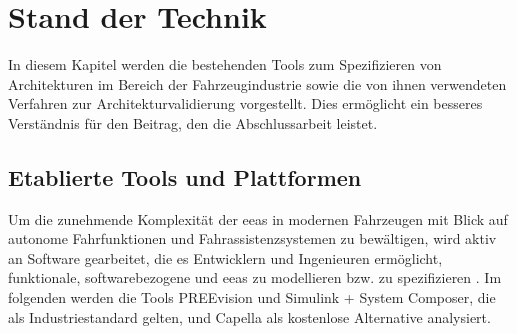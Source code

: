 
\chapter{Stand der Technik}
\label{ch:relatedWork}


In diesem Kapitel werden die bestehenden Tools zum Spezifizieren von Architekturen im Bereich der Fahrzeugindustrie sowie die von ihnen verwendeten Verfahren zur Architekturvalidierung vorgestellt. Dies ermöglicht ein besseres Verständnis für den Beitrag, den die Abschlussarbeit leistet.

\section{Etablierte Tools und Plattformen}
Um die zunehmende Komplexität der \glspl{eea} in modernen Fahrzeugen mit Blick auf autonome Fahrfunktionen und Fahrassistenzsystemen zu bewältigen, wird aktiv an Software gearbeitet, die es Entwicklern und Ingenieuren ermöglicht, funktionale, softwarebezogene und \glspl{eea} zu modellieren bzw. zu spezifizieren \cite{askaripoor2022architecture} \cite{schauffele2016architectural}. Im folgenden werden die Tools PREEvision und Simulink + System Composer, die als Industriestandard gelten, und Capella als kostenlose Alternative analysiert.


